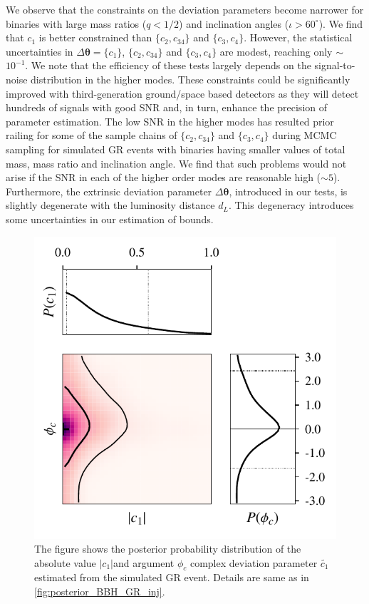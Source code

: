 \documentclass[prd,preprintnumbers,twocolumn,eqsecnum,floatfix,a4paper,nofootinbib,superscriptaddress]{revtex4}
\newcommand{\btheta}{\bm{\theta}}
\begin{document}
We observe that the constraints on the deviation parameters become narrower for binaries with large mass ratios ($q < 1/ 2$) and inclination angles ($\iota > 60 ^\circ $). We find that $c_1$ is better constrained than $\{c_2, c_{34}\}$ and $\{c_3, c_{4}\}$. However, the statistical uncertainties in $\Delta \btheta=\{c_1\}$, $\{c_2, c_{34}\}$ and $\{c_3, c_{4}\}$  are modest, reaching only $\sim$ $10^{-1}$. We note that the efficiency of these tests largely depends on the signal-to-noise distribution in the higher modes. These constraints could be significantly improved with third-generation ground/space based detectors as they will detect hundreds of signals with good SNR and, in turn, enhance the precision of parameter estimation. The low SNR in the higher modes has resulted prior railing for some of the sample chains of $\{c_2, c_{34}\}$ and $\{c_3, c_{4}\}$ during MCMC sampling for simulated GR events with binaries having smaller values of total mass, mass ratio and inclination angle. We find that such problems would not arise if the SNR in each of the higher order modes are reasonable high ($\sim 5$). Furthermore, the extrinsic deviation parameter $\Delta \btheta$, introduced in our tests, is slightly degenerate with the luminosity distance $d_L$. This degeneracy introduces some uncertainties in our estimation of bounds. 

 \begin{figure}[tbh]
 	\begin{center}
 		\includegraphics[scale=0.8]{figs/M_80_q_9_SNR_25_complex_c1.pdf}
 	\end{center} 
 	\caption{The figure shows the posterior probability distribution of the absolute value $|c_1|$and argument $\phi_c$ complex deviation parameter $\tilde{c_1}$ estimated from the simulated GR event. Details are same as in \ref{fig:posterior_BBH_GR_inj}.}
 	\label{fig:c1_complex}
 \end{figure}
 
\end{document}
